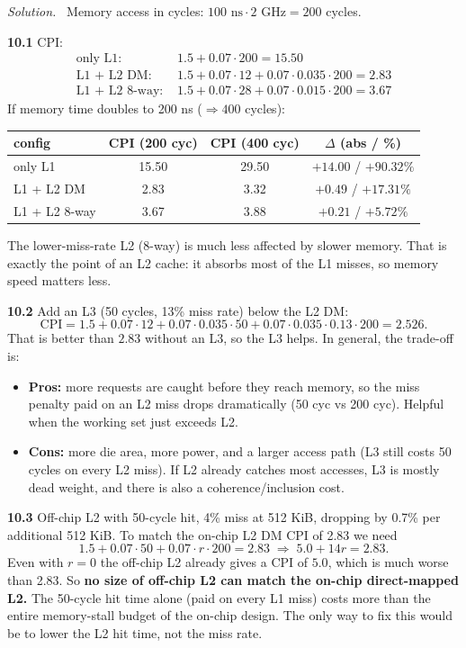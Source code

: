 \documentclass[12pt]{article}
\newenvironment{solution}{\par\noindent\textit{Solution.}\ }{\par\vspace{1.1em}}
\newcommand{\subproblem}[1]{\par\vspace{0.45em}\noindent\textbf{#1}\quad}
\begin{document}
\begin{solution}
Memory access in cycles: $100\text{ ns} \cdot 2\text{ GHz} = 200$ cycles.

\subproblem{10.1} CPI:
\begin{align*}
\text{only L1: }       & 1.5 + 0.07\cdot 200 = \mathbf{15.50} \\
\text{L1 + L2 DM: }    & 1.5 + 0.07\cdot 12 + 0.07\cdot 0.035\cdot 200 = \mathbf{2.83} \\
\text{L1 + L2 8-way: } & 1.5 + 0.07\cdot 28 + 0.07\cdot 0.015\cdot 200 = \mathbf{3.67}
\end{align*}
If memory time doubles to 200 ns ($\Rightarrow 400$ cycles):
\begin{center}\small
\begin{tabular}{@{}lccc@{}}\toprule
config & CPI (200 cyc) & CPI (400 cyc) & $\Delta$ (abs / \%) \\\midrule
only L1       & 15.50 & 29.50 & $+14.00$ / $+90.32\%$ \\
L1 + L2 DM    & 2.83  & 3.32  & $+0.49$  / $+17.31\%$ \\
L1 + L2 8-way & 3.67  & 3.88  & $+0.21$  / $+5.72\%$ \\
\bottomrule\end{tabular}\end{center}
The lower-miss-rate L2 (8-way) is much less affected by slower memory. That is exactly the point of an L2 cache: it absorbs most of the L1 misses, so memory speed matters less.

\subproblem{10.2} Add an L3 (50 cycles, 13\% miss rate) below the L2 DM:
\[
\text{CPI} = 1.5 + 0.07\cdot 12 + 0.07\cdot 0.035\cdot 50 + 0.07\cdot 0.035\cdot 0.13\cdot 200 = \mathbf{2.526}.
\]
That is better than $2.83$ without an L3, so the L3 helps. In general, the trade-off is:
\begin{itemize}\itemsep0pt
    \item \textbf{Pros:} more requests are caught before they reach memory, so the miss penalty paid on an L2 miss drops dramatically (50 cyc vs 200 cyc). Helpful when the working set just exceeds L2.
    \item \textbf{Cons:} more die area, more power, and a larger access path (L3 still costs 50 cycles on every L2 miss). If L2 already catches most accesses, L3 is mostly dead weight, and there is also a coherence/inclusion cost.
\end{itemize}

\subproblem{10.3} Off-chip L2 with 50-cycle hit, 4\% miss at 512 KiB, dropping by 0.7\% per additional 512 KiB. To match the on-chip L2 DM CPI of 2.83 we need
\[
1.5 + 0.07\cdot 50 + 0.07\cdot r\cdot 200 = 2.83 \;\Rightarrow\; 5.0 + 14r = 2.83.
\]
Even with $r = 0$ the off-chip L2 already gives a CPI of $5.0$, which is much worse than 2.83. So \textbf{no size of off-chip L2 can match the on-chip direct-mapped L2.} The 50-cycle hit time alone (paid on every L1 miss) costs more than the entire memory-stall budget of the on-chip design. The only way to fix this would be to lower the L2 hit time, not the miss rate.
\end{solution}
\end{document}
